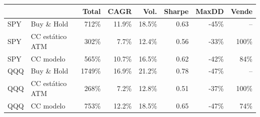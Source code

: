 \begin{tabular}{@{}llrrrrrr@{}}
\toprule
& & \textbf{Total} & \textbf{CAGR} & \textbf{Vol.} & \textbf{Sharpe} & \textbf{MaxDD} & \textbf{Vende} \\ \midrule
SPY & Buy \& Hold & 712\% & 11.9\% & 18.5\% & 0.63 & -45\% & -- \\
SPY & CC estático ATM & 302\% & 7.7\% & 12.4\% & 0.56 & -33\% & 100\% \\
SPY & CC modelo & 565\% & 10.7\% & 16.5\% & 0.62 & -42\% & 84\% \\
\midrule
QQQ & Buy \& Hold & 1749\% & 16.9\% & 21.2\% & 0.78 & -47\% & -- \\
QQQ & CC estático ATM & 268\% & 7.2\% & 12.8\% & 0.51 & -37\% & 100\% \\
QQQ & CC modelo & 753\% & 12.2\% & 18.5\% & 0.65 & -47\% & 74\% \\
\bottomrule
\end{tabular}
